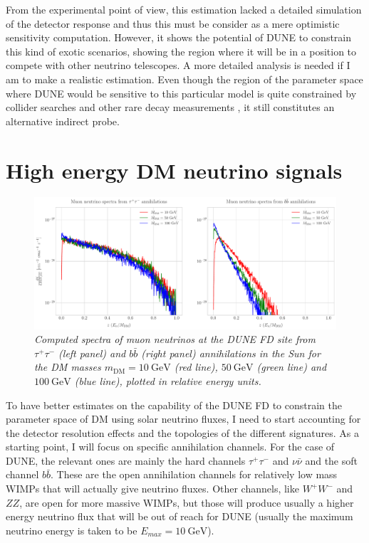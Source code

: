 From the experimental point of view, this estimation lacked a detailed simulation of the detector response and thus this must be consider as a mere optimistic sensitivity computation. However, it shows the potential of DUNE to constrain this kind of exotic scenarios, showing the region where it will be in a position to compete with other neutrino telescopes. A more detailed analysis is needed if I am to make a realistic estimation. Even though the region of the parameter space where DUNE would be sensitive to this particular model is quite constrained by collider searches \cite{Deutschmann2017} and other rare decay measurements \cite{Haisch2007, Freitas2008}, it still constitutes an alternative indirect probe.

\section{High energy DM neutrino signals}

\begin{figure}[t]
	\centering
	\includegraphics[width=1\linewidth]{Images/DM_Analysis/solardm_nu_mu_spectra.pdf}
	\caption{\textit{Computed spectra of muon neutrinos at the DUNE FD site from $\tau^{+} \tau^{-}$ (left panel) and $b\bar{b}$ (right panel) annihilations in the Sun for the DM masses $m_{\mathrm{DM}} = 10 \ \mathrm{GeV}$ (red line), $50 \ \mathrm{GeV}$ (green line) and $100 \ \mathrm{GeV}$ (blue line), plotted in relative energy units.}}
	\label{fig:solardm_nu_mu_spectra}
\end{figure}

To have better estimates on the capability of the DUNE FD to constrain the parameter space of DM using solar neutrino fluxes, I need to start accounting for the detector resolution effects and the topologies of the different signatures. As a starting point, I will focus on specific annihilation channels. For the case of DUNE, the relevant ones are mainly the hard channels $\tau^{+} \tau^{-}$ and $\nu \bar{\nu}$ and the soft channel $b\bar{b}$. These are the open annihilation channels for relatively low mass WIMPs that will actually give neutrino fluxes. Other channels, like $W^{+} W^{-}$ and $ZZ$, are open for more massive WIMPs, but those will produce usually a higher energy neutrino flux that will be out of reach for DUNE (usually the maximum neutrino energy is taken to be $E_{max} = 10 \ \mathrm{GeV}$).

